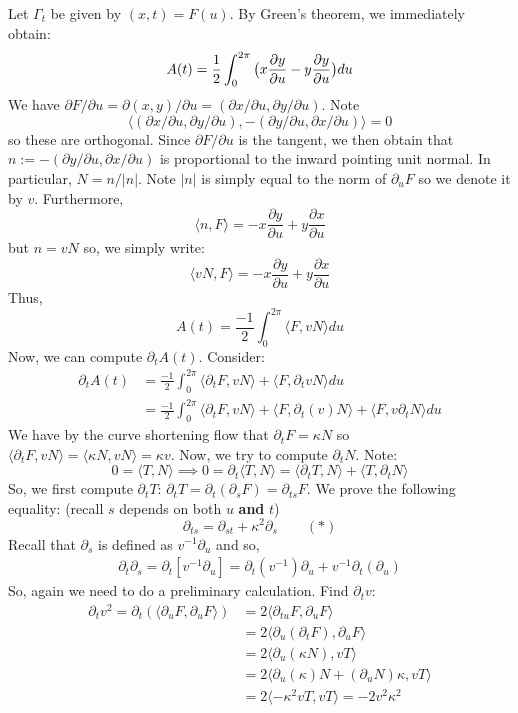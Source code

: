 \documentclass{article}
\begin{document}
Let $\Gamma_t$ be given by $(x,t) = F(u)$. By Green's theorem, we immediately obtain:
\[ A(t) = \frac{1}{2} \int_{0}^{2\pi} \big{(}x\frac{\partial y}{\partial u} - y\frac{\partial y}{\partial u}\big{)}du \]
We have $\partial F/\partial u = \partial (x,y) / \partial u = (\partial x/\partial u, \partial y/\partial u)$. Note 
\[ \langle (\partial x/\partial u, \partial y/\partial u),-(\partial y/\partial u, \partial x/\partial u)\rangle=0 \]
so these are orthogonal. Since $\partial F/\partial u$ is the tangent, we then obtain that $n := -(\partial y/\partial u, \partial x/\partial u)$ is proportional to the inward pointing unit normal.
In particular, $N = n/|n|$. Note $|n|$ is simply equal to the norm of $\partial_u F$ so we denote it by $v$. Furthermore,
\[ \langle n, F\rangle = -x \frac{\partial y}{\partial u} + y\frac{\partial x}{\partial u} \]
but $n = vN$ so, we simply write:
\[ \langle vN, F\rangle = -x \frac{\partial y}{\partial u} + y\frac{\partial x}{\partial u} \]
Thus,
\[ A(t) = \frac{-1}{2} \int_0^{2\pi} \langle F, vN\rangle du \]
Now, we can compute $\partial_t A(t)$. Consider:
\begin{align*}
	\partial_t A(t) &= \frac{-1}{2} \int_0^{2\pi} \langle \partial_t F, vN\rangle + \langle F, \partial_t vN\rangle du \\
		&= \frac{-1}{2} \int_0^{2\pi} \langle \partial_t F, vN\rangle + \langle F, \partial_t (v)N\rangle +  \langle F, v\partial_t N\rangle du
\end{align*}
We have by the curve shortening flow that $\partial_t F = \kappa N$ so $\langle \partial_t F, vN\rangle = \langle \kappa N, vN\rangle = \kappa v$. Now, we try to compute $\partial_t N$.
Note:
\[ 0 = \langle T, N\rangle \implies 0 = \partial_t \langle T, N\rangle = \langle \partial_t T, N\rangle + \langle T, \partial_t N\rangle \]
So, we first compute $\partial_t T$: $\partial_t T = \partial_t (\partial_s F) = \partial_{ts} F$. We prove the following equality: (recall $s$ depends on both $u$ \textbf{and} $t$)
\[ \partial_{ts} = \partial_{st} + \kappa^2 \partial_s \qquad(*)\]
Recall that $\partial_s$ is defined as $v^{-1}\partial_u$ and so,
\begin{align*}
	\partial_t\partial_s = \partial_t[v^{-1}\partial_u] = \partial_t(v^{-1})\partial_u + v^{-1}\partial_t(\partial_u)
\end{align*}
So, again we need to do a preliminary calculation. Find $\partial_t v$:
\begin{align*}
	\partial_t v^2 = \partial_t(\langle \partial_u F, \partial_u F\rangle) &= 2\langle \partial_{tu} F, \partial_u F\rangle\\
		&= 2\langle \partial_{u}(\partial_t F), \partial_u F\rangle \\
		&= 2\langle \partial_u(\kappa N), vT\rangle \\
		&= 2\langle \partial_u(\kappa)N + (\partial_u N)\kappa, vT\rangle \\
		&= 2\langle -\kappa^2 vT, vT\rangle = -2v^2 \kappa^2
\end{align*}
\end{document}
